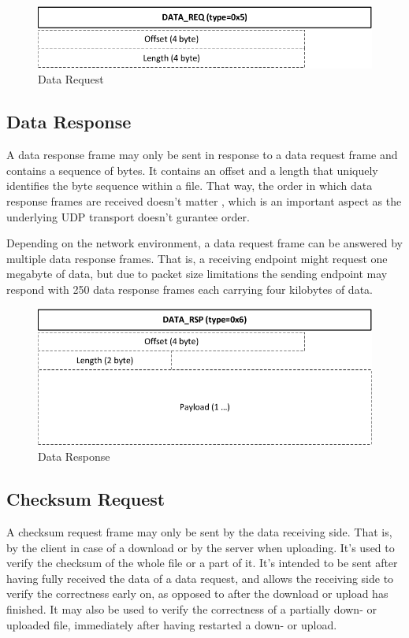 \documentclass[]{article}
\begin{document}
\begin{figure}[H]
\centering
\includegraphics[width=\textwidth]{frames/data-req.pdf}
\caption{Data Request}
\label{DATA-REQ}
\end{figure}

\subsection{Data Response}

A data response frame may only be sent in response to a data request frame and
contains a sequence of bytes. It contains an offset and a length that uniquely identifies the byte sequence
within a file. That way, the order in which data response frames are received doesn't matter
, which is an important aspect as the underlying UDP transport doesn't gurantee order.

Depending on the network environment, a data request frame can be answered by multiple
data response frames. That is, a receiving endpoint might request one megabyte of data, but
due to packet size limitations the sending endpoint may respond with 250 data response
frames each carrying four kilobytes of data.
 
\begin{figure}[H]
\centering
\includegraphics[width=\textwidth]{frames/data-rsp.pdf}
\caption{Data Response}
\label{DATA-RSP}
\end{figure}

\subsection{Checksum Request}
A checksum request frame may only be sent by the data receiving side. That is, by the client
in case of a download or by the server when uploading. It's used to verify the checksum of
the whole file or a part of it. It's intended to be sent after having fully received
the data of a data request, and allows the receiving side to verify the correctness early
on, as opposed to after the download or upload has finished. It may also be used to verify 
the correctness of a partially down- or uploaded file, immediately after having restarted
a down- or upload. 
\end{document}

